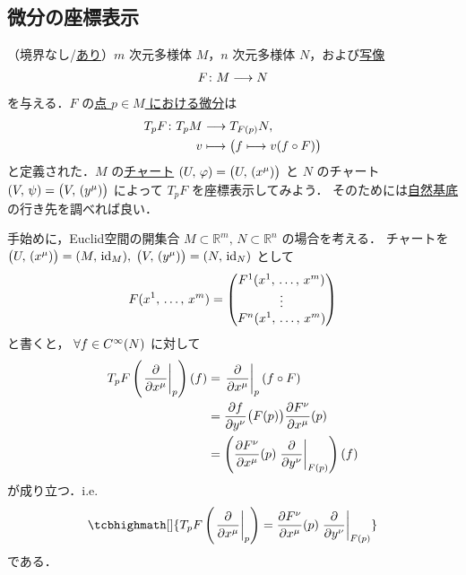 \documentclass[geometry_main]{subfiles}
\begin{document}
\subsection{微分の座標表示}

（境界なし/\hyperref[def:mani-with-boundary]{あり}）$m$ 次元\cinfty 多様体 $M$，$n$ 次元\cinfty 多様体 $N$，および\hyperref[def.cinfty_mapping]{\cinfty 写像}
\begin{align}
	F \colon M \longrightarrow N
\end{align}
を与える．$F$ の\hyperref[def:functor-Tp]{点 $p \in M$ における微分}は
\begin{align}
	T_p F \colon T_p M &\longrightarrow T_{F(p)} N, \\
	v &\longmapsto \bigl( f \longmapsto v(f \circ F) \bigr) 
\end{align}
と定義された．$M$ の\hyperref[diffmani]{\cinfty チャート} $(U,\, \varphi) = \bigl(U,\, (x^\mu)\bigr)$ と $N$ の\cinfty チャート $(V,\, \psi) = \bigl(V,\, (y^\mu)\bigr)$ によって $T_p F$ を座標表示してみよう．
そのためには\hyperref[naturalbasis]{自然基底}の行き先を調べれば良い．

手始めに，Euclid空間の開集合 $M \subset \mathbb{R}^m,\, N \subset \mathbb{R}^n$ の場合を考える．
チャートを $\bigl(U,\, (x^\mu)\bigr) = (M,\, \mathrm{id}_M),\; \bigl(V,\, (y^\mu)\bigr) = (N,\, \mathrm{id}_N)$ として
\begin{align}
	F(x^1,\, \dots,\, x^m) = \mqty(F^1(x^1,\, \dots,\, x^m) \\ \vdots \\ F^n (x^1,\, \dots,\, x^m))
\end{align}
と書くと，
$\forall f \in C^\infty(N)$ に対して
\begin{align}
	T_p F \left( \eval{\pdv{}{x^\mu}}_p  \right) (f) &= \eval{\pdv{}{x^\mu}}_p (f \circ F) \\
	&= \pdv{f}{y^\nu}() \bigl(F(p)\bigr) \pdv{F^\nu}{x^\mu}()(p) \\
	&= \left(\pdv{F^\nu}{x^\mu}()(p) \eval{\pdv{}{y^\nu}}_{F(p)}\right) (f)
\end{align}
が成り立つ．i.e.
\begin{align}
	\label{eq:coord-3}
	\tcbhighmath[]{T_p F \left( \eval{\pdv{}{x^\mu}}_p  \right) = \pdv{F^\nu}{x^\mu}()(p) \eval{\pdv{}{y^\nu}}_{F(p)}}
\end{align}
である．
\end{document}
